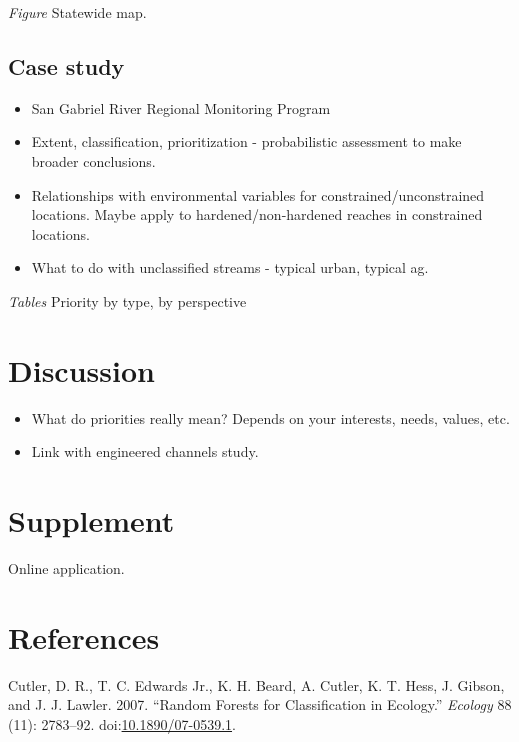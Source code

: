 \documentclass[]{article}
\begin{document}
\emph{Figure} Statewide map.

\subsection{Case study}\label{case-study}

\begin{itemize}
\item
  San Gabriel River Regional Monitoring Program
\item
  Extent, classification, prioritization - probabilistic assessment to
  make broader conclusions.
\item
  Relationships with environmental variables for
  constrained/unconstrained locations. Maybe apply to
  hardened/non-hardened reaches in constrained locations.
\item
  What to do with unclassified streams - typical urban, typical ag.
\end{itemize}

\emph{Tables} Priority by type, by perspective

\section{Discussion}\label{discussion}

\begin{itemize}
\item
  What do priorities really mean? Depends on your interests, needs,
  values, etc.
\item
  Link with engineered channels study.
\end{itemize}

\section{Supplement}\label{supplement}

Online application.

\section*{References}\label{references}

\hypertarget{refs}{}
\hypertarget{ref-Cutler07}{}
Cutler, D. R., T. C. Edwards Jr., K. H. Beard, A. Cutler, K. T. Hess, J.
Gibson, and J. J. Lawler. 2007. ``Random Forests for Classification in
Ecology.'' \emph{Ecology} 88 (11): 2783--92.
doi:\href{https://doi.org/10.1890/07-0539.1}{10.1890/07-0539.1}.
\end{document}
